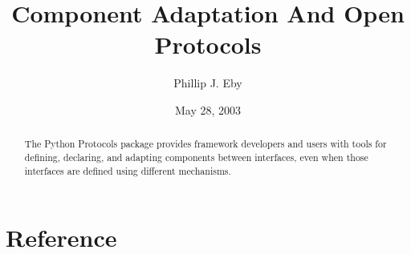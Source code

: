 \documentclass{manual}
\title{Component Adaptation And Open Protocols}
\author{Phillip J. Eby}
\date{May 28, 2003}       %
\begin{document}
\maketitle


%

\begin{abstract}

\noindent

The Python Protocols package provides framework developers and users with
tools for defining, declaring, and adapting components between interfaces,
even when those interfaces are defined using different mechanisms.

\end{abstract}

\tableofcontents

\chapter{Reference}













%
%
%
\renewcommand{\indexname}{Module Index}

\renewcommand{\indexname}{Index}
\end{document}
